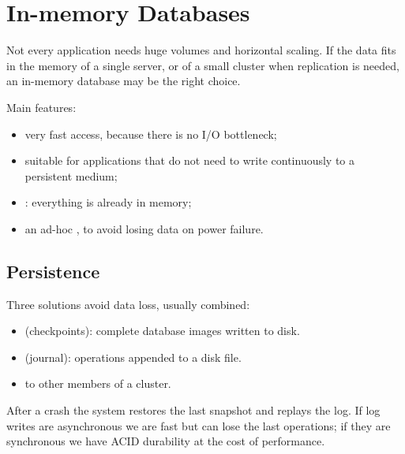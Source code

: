 \section{In-memory Databases}\label{sec:inmemory}

Not every application needs huge volumes and horizontal scaling. If the data fits in the memory of a single server, or of a small cluster when replication is needed, an in-memory database may be the right choice.

Main features:
\begin{itemize}
  \item very fast access, because there is no I/O bottleneck;
  \item suitable for applications that do not need to write continuously to a persistent medium;
  \item {}: everything is already in memory;
  \item an ad-hoc , to avoid losing data on power failure.
\end{itemize}

\subsection{Persistence}
Three solutions avoid data loss, usually combined:
\begin{itemize}
  \item {} (checkpoints): complete database images written to disk.
  \item {} (journal): operations appended to a disk file.
  \item {} to other members of a cluster.
\end{itemize}
After a crash the system restores the last snapshot and replays the log. If log writes are asynchronous we are fast but can lose the last operations; if they are synchronous we have ACID durability at the cost of performance.

